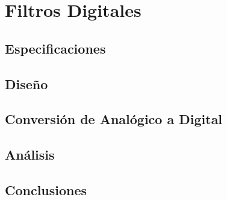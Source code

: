 \chapter{Filtros Digitales}
\section{Especificaciones}

\section{Diseño}

\section{Conversión de Analógico a Digital}

\section{Análisis}

\section{Conclusiones}